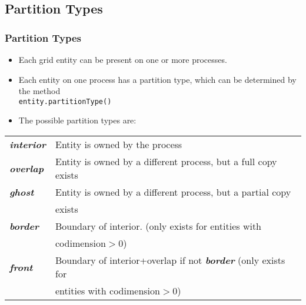 \subsection{Partition Types}
\begin{frame}[fragile]
\frametitle<presentation>{Partition Types}

\begin{itemize}
\item Each grid entity can be present on one or more processes.
\item Each entity on one process has a partition type, which can be determined
by the method\\
        \hspace*{1cm}\lstinline!entity.partitionType()!
\item The possible partition types are:\\
\end{itemize}
\begin{tabular}{ll}
  \em \bfseries interior
  & Entity is owned by the process\\
  \em \bfseries overlap & Entity is owned by a different process, but a full copy exists\\
  \em \bfseries ghost
  & Entity is owned by a different process, but a partial copy\\
  & exists\\
  \em \bfseries border
  & Boundary of interior. (only exists for entities with \\
  & codimension$>$0)\\
  \em \bfseries front
  & Boundary of interior+overlap if not {\em \bfseries border} (only exists for\\
  & entities with codimension$>$0)
\end{tabular}
\end{frame}


